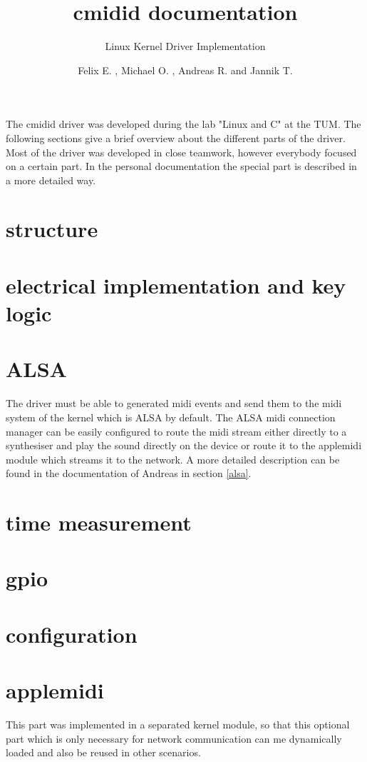 \documentclass[paper=a4,fontsize=11pt,pagesize,bibtotoc]{scrartcl}
\title{cmidid documentation}
\subtitle{Linux Kernel Driver Implementation}
\author{Felix E. , Michael O. , Andreas R. and Jannik T.}
\begin{document}
	\maketitle
	
The cmidid driver was developed during the lab "Linux and C" at the TUM. The following sections give a brief overview about the different parts of the driver. Most of the driver was developed in close teamwork, however everybody focused on a certain part. In the personal documentation the special part is described in a more detailed way.

\section{structure}
\section{electrical implementation and key logic}
\section{ALSA}
The driver must be able to generated midi events and send them to the midi system of the kernel which is ALSA by default. The ALSA midi connection manager can be easily configured to route the midi stream either directly to a synthesiser and play the sound directly on the device or route it to the applemidi module which streams it to the network. 
A more detailed description can be found in the documentation of Andreas in section \ref{alsa}.
\section{time measurement}
\section{gpio}
\section{configuration}
\section{applemidi}
This part was implemented in a separated kernel module, so that this optional part which is only necessary for network communication can me dynamically loaded and also be reused in other scenarios. 
\end{document}
